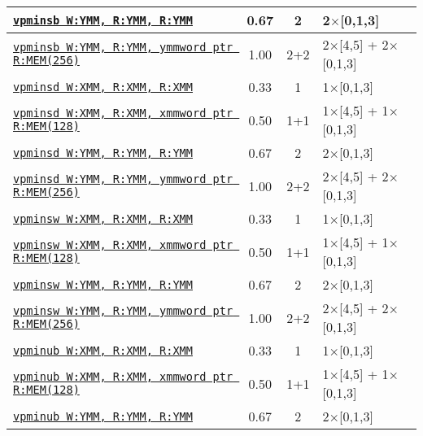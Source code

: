 \documentclass[a4paper,english,fontsize=9]{scrartcl}
\begin{document}
\begin{longtable}{p{}ccL{.25\textwidth}}
  \midrule
  \texttt{\href{https://felixcloutier.com/x86/PMINSB:PMINSW.html}{vpminsb W:YMM, R:YMM, R:YMM}} & 0.67 & 2 & 2\(\times\)[0,1,3] \\
  \midrule
  \texttt{\href{https://felixcloutier.com/x86/PMINSB:PMINSW.html}{vpminsb W:YMM, R:YMM, ymmword ptr R:MEM(256)}} & 1.00 & 2+2 & 2\(\times\)[4,5] + 2\(\times\)[0,1,3] \\
  \midrule
  \texttt{\href{https://felixcloutier.com/x86/PMINSD:PMINSQ.html}{vpminsd W:XMM, R:XMM, R:XMM}} & 0.33 & 1 & 1\(\times\)[0,1,3] \\
  \midrule
  \texttt{\href{https://felixcloutier.com/x86/PMINSD:PMINSQ.html}{vpminsd W:XMM, R:XMM, xmmword ptr R:MEM(128)}} & 0.50 & 1+1 & 1\(\times\)[4,5] + 1\(\times\)[0,1,3] \\
  \midrule
  \texttt{\href{https://felixcloutier.com/x86/PMINSD:PMINSQ.html}{vpminsd W:YMM, R:YMM, R:YMM}} & 0.67 & 2 & 2\(\times\)[0,1,3] \\
  \midrule
  \texttt{\href{https://felixcloutier.com/x86/PMINSD:PMINSQ.html}{vpminsd W:YMM, R:YMM, ymmword ptr R:MEM(256)}} & 1.00 & 2+2 & 2\(\times\)[4,5] + 2\(\times\)[0,1,3] \\
  \midrule
  \texttt{\href{https://felixcloutier.com/x86/PMINSB:PMINSW.html}{vpminsw W:XMM, R:XMM, R:XMM}} & 0.33 & 1 & 1\(\times\)[0,1,3] \\
  \midrule
  \texttt{\href{https://felixcloutier.com/x86/PMINSB:PMINSW.html}{vpminsw W:XMM, R:XMM, xmmword ptr R:MEM(128)}} & 0.50 & 1+1 & 1\(\times\)[4,5] + 1\(\times\)[0,1,3] \\
  \midrule
  \texttt{\href{https://felixcloutier.com/x86/PMINSB:PMINSW.html}{vpminsw W:YMM, R:YMM, R:YMM}} & 0.67 & 2 & 2\(\times\)[0,1,3] \\
  \midrule
  \texttt{\href{https://felixcloutier.com/x86/PMINSB:PMINSW.html}{vpminsw W:YMM, R:YMM, ymmword ptr R:MEM(256)}} & 1.00 & 2+2 & 2\(\times\)[4,5] + 2\(\times\)[0,1,3] \\
  \midrule
  \texttt{\href{https://felixcloutier.com/x86/PMINUB:PMINUW.html}{vpminub W:XMM, R:XMM, R:XMM}} & 0.33 & 1 & 1\(\times\)[0,1,3] \\
  \midrule
  \texttt{\href{https://felixcloutier.com/x86/PMINUB:PMINUW.html}{vpminub W:XMM, R:XMM, xmmword ptr R:MEM(128)}} & 0.50 & 1+1 & 1\(\times\)[4,5] + 1\(\times\)[0,1,3] \\
  \midrule
  \texttt{\href{https://felixcloutier.com/x86/PMINUB:PMINUW.html}{vpminub W:YMM, R:YMM, R:YMM}} & 0.67 & 2 & 2\(\times\)[0,1,3] \\
  \midrule

\end{longtable}
\end{document}
